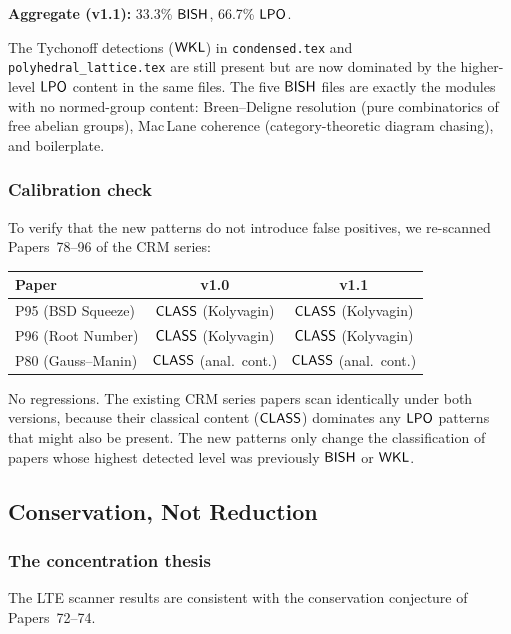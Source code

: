 \noindent\textbf{Aggregate (v1.1):} 33.3\% $\textsf{BISH}$, 66.7\% $\textsf{LPO}$.

The Tychonoff detections ($\textsf{WKL}$) in \texttt{condensed.tex} and
\texttt{polyhedral\_lattice.tex} are still present but are now dominated
by the higher-level $\textsf{LPO}$ content in the same files.  The five
$\textsf{BISH}$ files are exactly the modules with no normed-group content:
Breen--Deligne resolution (pure combinatorics of free abelian groups),
Mac\,Lane coherence (category-theoretic diagram chasing), and
boilerplate.

\subsubsection{Calibration check}\label{sec:calibration}

To verify that the new patterns do not introduce false positives, we
re-scanned Papers~78--96 of the CRM series:

\begin{center}
\small
\begin{tabular}{lcc}
\toprule
\textbf{Paper} & \textbf{v1.0} & \textbf{v1.1} \\
\midrule
P95 (BSD Squeeze) & $\textsf{CLASS}$ (Kolyvagin) & $\textsf{CLASS}$ (Kolyvagin) \\
P96 (Root Number)  & $\textsf{CLASS}$ (Kolyvagin) & $\textsf{CLASS}$ (Kolyvagin) \\
P80 (Gauss--Manin) & $\textsf{CLASS}$ (anal.\ cont.) & $\textsf{CLASS}$ (anal.\ cont.) \\
\bottomrule
\end{tabular}
\end{center}

No regressions.  The existing CRM series papers scan identically under
both versions, because their classical content ($\textsf{CLASS}$) dominates any
$\textsf{LPO}$ patterns that might also be present.  The new patterns only
change the classification of papers whose highest detected level was
previously $\textsf{BISH}$ or $\textsf{WKL}$.


\subsection{Conservation, Not Reduction}\label{part:conservation}

\subsubsection{The concentration thesis}\label{sec:concentration}

The LTE scanner results are consistent with the conservation
conjecture of Papers~72--74.

